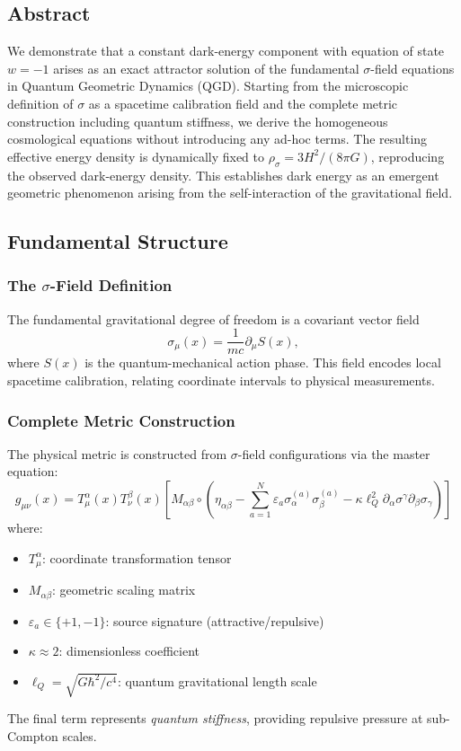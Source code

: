 \documentclass[11pt,a4paper]{article}
\theoremstyle{definition}
\theoremstyle{remark}
\begin{document}
	\subsection{Abstract}
	We demonstrate that a constant dark-energy component with equation of state $w=-1$ arises as an exact attractor solution of the fundamental $\sigma$-field equations in Quantum Geometric Dynamics (QGD). Starting from the microscopic definition of $\sigma$ as a spacetime calibration field and the complete metric construction including quantum stiffness, we derive the homogeneous cosmological equations without introducing any ad-hoc terms. The resulting effective energy density is dynamically fixed to $\rho_\sigma = 3H^2/(8\pi G)$, reproducing the observed dark-energy density. This establishes dark energy as an emergent geometric phenomenon arising from the self-interaction of the gravitational field.
	
	\subsection{Fundamental Structure}
	
	\subsubsection{The $\sigma$-Field Definition}
	The fundamental gravitational degree of freedom is a covariant vector field
	\[
	\sigma_\mu(x) = \frac{1}{mc} \partial_\mu S(x),
	\]
	where $S(x)$ is the quantum-mechanical action phase. This field encodes local spacetime calibration, relating coordinate intervals to physical measurements.
	
	\subsubsection{Complete Metric Construction}
	The physical metric is constructed from $\sigma$-field configurations via the master equation:
	\begin{equation}
		\boxed{
			g_{\mu\nu}(x) = T^\alpha_\mu(x) T^\beta_\nu(x) \left[ M_{\alpha\beta} \circ \left( \eta_{\alpha\beta} - \sum_{a=1}^N \varepsilon_a \sigma_\alpha^{(a)} \sigma_\beta^{(a)} - \kappa \ell_Q^2 \partial_\alpha \sigma^\gamma \partial_\beta \sigma_\gamma \right) \right]
		}
		\label{eq:master}
	\end{equation}
	where:
	\begin{itemize}
		\item $T^\alpha_\mu$: coordinate transformation tensor
		\item $M_{\alpha\beta}$: geometric scaling matrix
		\item $\varepsilon_a \in \{+1,-1\}$: source signature (attractive/repulsive)
		\item $\kappa \approx 2$: dimensionless coefficient
		\item $\ell_Q = \sqrt{G\hbar^2/c^4}$: quantum gravitational length scale
	\end{itemize}
	The final term represents \emph{quantum stiffness}, providing repulsive pressure at sub-Compton scales.
	
\end{document}
